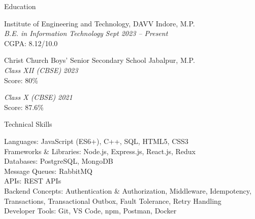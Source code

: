 \documentclass[12pt]{resume}
\begin{document}
\begin{rSection}{Education}

\textmd{Institute of Engineering and Technology, DAVV} \hfill Indore, M.P. \\
\textit{B.E. in Information Technology} \hfill \textit{Sept 2023 -- Present} \\
CGPA: 8.12/10.0

\vspace{0.1em}

\textmd{Christ Church Boys' Senior Secondary School} \hfill Jabalpur, M.P. \\
\textit{Class XII (CBSE)} \hfill \textit{2023} \\
Score: 80\%

\textit{Class X (CBSE)} \hfill \textit{2021} \\
Score: 87.6\%

\end{rSection}

\begin{rSection}{Technical Skills}

\textmd{Languages:} JavaScript (ES6+), C++, SQL, HTML5, CSS3 \\
\textmd{Frameworks \& Libraries:} Node.js, Express.js, React.js, Redux \\
\textmd{Databases:} PostgreSQL, MongoDB \\
\textmd{Message Queues:} RabbitMQ \\
\textmd{APIs:} REST APIs \\
\textmd{Backend Concepts:} Authentication \& Authorization, Middleware, Idempotency, Transactions, Transactional Outbox, Fault Tolerance, Retry Handling \\
\textmd{Developer Tools:} Git, VS Code, npm, Postman, Docker

\end{rSection}
\end{document}
